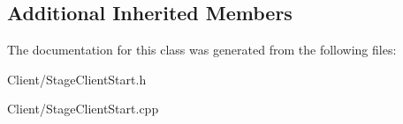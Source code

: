 \subsection*{Additional Inherited Members}


The documentation for this class was generated from the following files\-:\begin{DoxyCompactItemize}
\item 
Client/Stage\-Client\-Start.\-h\item 
Client/Stage\-Client\-Start.\-cpp\end{DoxyCompactItemize}
